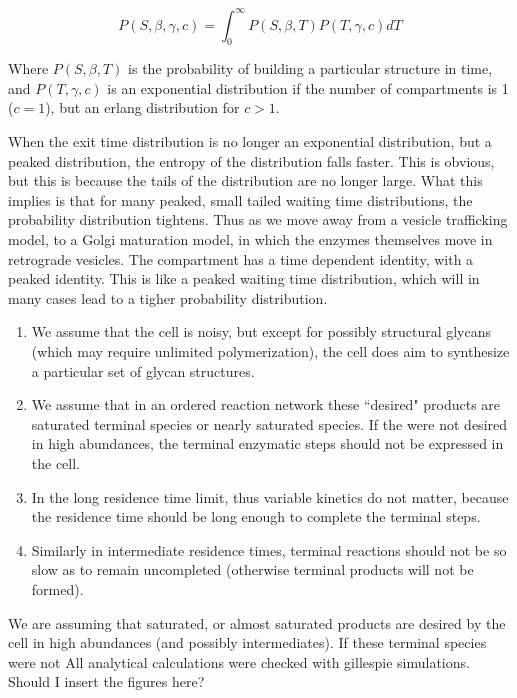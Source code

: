 \documentclass{article}
\begin{document}
\begin{equation} 
P(S,\beta,\gamma,c)=\int_0^\infty P(S,\beta,T)P(T,\gamma,c)dT
\end{equation}

Where $P(S,\beta,T)$ is the probability of building a particular structure in time, and $P(T,\gamma,c)$ is an exponential distribution if the number of compartments is 1 ($c=1$), but an erlang distribution for $c>1$. 

When the exit time distribution is no longer an exponential distribution, but a peaked distribution, the entropy of the distribution falls faster. This is obvious, but this is because the tails of the distribution are no longer large. What this implies is that for many peaked, small tailed waiting time distributions, the probability distribution tightens. Thus as we move away from a vesicle trafficking model, to a Golgi maturation model, in which the enzymes themselves move in retrograde vesicles. The compartment has a time dependent identity, with a peaked identity. This is like a peaked waiting time distribution, which will in many cases lead to a tigher probability distribution. 

\begin{enumerate}
\item We assume that the cell is noisy, but except for possibly structural glycans (which may require unlimited polymerization), the cell does aim to synthesize a particular set of glycan structures.
\item We assume that in an ordered reaction network these ``desired" products are saturated terminal species or nearly saturated species. If the were not desired in high abundances, the terminal enzymatic steps should not be expressed in the cell. 
\item In the long residence time limit, thus variable kinetics do not matter, because the residence time should be long enough to complete the terminal steps. 
\item Similarly in intermediate residence times, terminal reactions should not be so slow as to remain uncompleted (otherwise terminal products will not be formed).  
\end{enumerate}

We are assuming that saturated, or almost saturated products are desired by the cell in high abundances (and possibly intermediates). If these terminal species were not   All analytical calculations were checked with gillespie simulations. Should I insert the figures here?
\end{document}
